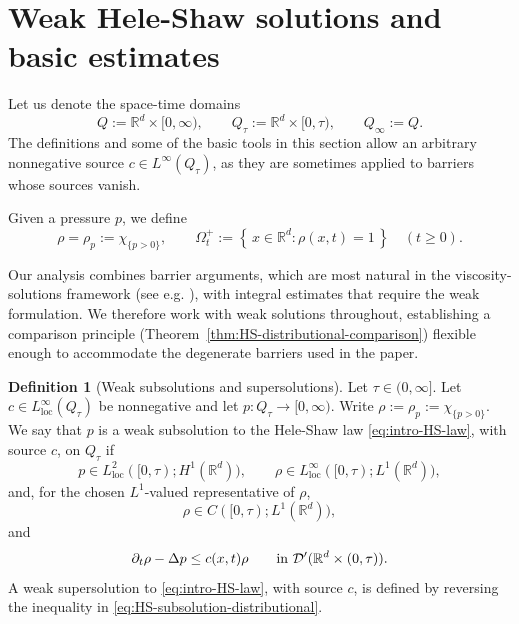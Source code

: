 \documentclass[11pt]{amsart}
\numberwithin{equation}{section}
\numberwithin{figure}{section}
\theoremstyle{plain}
\theoremstyle{definition}
\newtheorem{defn}[thm]{Definition}
\theoremstyle{remark}
\theoremstyle{plain}
\newcommand{\set}[1]{\left\{\, #1 \,\right\}}
\def\R{\mathbb{R}}
\begin{document}
\section{Weak Hele-Shaw solutions and basic estimates}\label{sec:HS-weak-basic}

Let us denote the space-time domains
\[
    Q:=\R^d\times[0,\infty),\qquad
    Q_\tau:=\R^d\times[0,\tau),\qquad Q_\infty:=Q.
\]
The definitions and some of the basic tools in this section allow an arbitrary
nonnegative source \(c\in L^\infty(Q_\tau)\), as they are sometimes applied to
barriers whose sources vanish.


Given a pressure \(p\), we define
\begin{equation}\label{eq:HS-basic-notation}
    \rho=\rho_p:=\chi_{\{p>0\}},
 \qquad
    \Omega_t^{+}:=\set{x\in\R^d:\rho(x,t)=1}\quad(t\geq0).
\end{equation}

Our analysis combines barrier arguments, which are most natural in the viscosity-solutions framework (see e.g. \cite{kimZhang24}), with integral estimates that require the weak formulation. We therefore work with weak solutions throughout, establishing a comparison principle (Theorem~\ref{thm:HS-distributional-comparison}) flexible enough to accommodate the degenerate barriers used in the paper.

\begin{defn}[Weak subsolutions and supersolutions]
\label{def:HS-distributional-subsuper}
Let \(\tau\in(0,\infty]\).  Let \(c\in L^\infty_{\operatorname{loc}}(Q_\tau)\)
be nonnegative and let \(p:Q_\tau\to[0,\infty)\).  Write
\(\rho:=\rho_p:=\chi_{\{p>0\}}\).  We say that \(p\) is a weak subsolution to
the Hele-Shaw law \eqref{eq:intro-HS-law}, with source \(c\), on \(Q_\tau\) if
\begin{equation}\label{eq:HS-weak-regularity}
    p\in L^2_{\operatorname{loc}}([0,\tau);H^1(\R^d)),
    \qquad
    \rho\in L^\infty_{\operatorname{loc}}([0,\tau);L^1(\R^d)),
\end{equation}
and, for the chosen \(L^1\)-valued representative of \(\rho\),
\begin{equation}\label{eq:HS-weak-time-traces}
    \rho\in C([0,\tau);L^1(\R^d)),
\end{equation}
and
\begin{equation}\label{eq:HS-subsolution-distributional}
    \partial_t\rho-\Delta p\leq c(x,t)\rho
    \qquad\hbox{in }\mathcal D'(\R^d\times(0,\tau)).
\end{equation}
A weak supersolution to \eqref{eq:intro-HS-law}, with source \(c\), is
defined by reversing the inequality in \eqref{eq:HS-subsolution-distributional}.
\end{defn}
\end{document}
